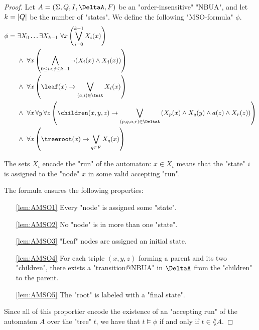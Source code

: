 \documentclass[a4paper,UKenglish,cleveref, autoref, thm-restate]{lipics-v2021}
\begin{document}
\begin{proof}
	Let $A = \NBUA$ be an "order-insensitive" "NBUA", and let $k = \left|Q\right|$ be the number of "states".
	We define the following "MSO-formula" $\phi$.
	\begin{align}
		\phi =\  & \exists X_0 \ldots \exists X_{k-1} \ \forall x \left( \bigvee_{i=0}^{k-1} X_i(x) \right) \label{lem:AMSO1}                                                                                     \\
		         & \land\ \forall x \left( \bigwedge_{0 \leq i < j \leq k-1} \lnot (X_i(x) \land X_j(x)) \right) \label{lem:AMSO2}                                                                                \\
		         & \land\ \forall x \left( \leaf(x) \rightarrow \bigvee_{(a,i) \in \Init} X_i(x) \right) \label{lem:AMSO3}                                                                                        \\
		         & \land\ \forall x\, \forall y\, \forall z \left(\children(x,y,z) \rightarrow \bigvee_{(p,q,a,r) \in \DeltaA} \left(X_p(x) \land X_q(y) \land a(z) \land X_r(z)\right) \right) \label{lem:AMSO4} \\
		         & \land\ \forall x \left( \treeroot(x) \rightarrow \bigvee_{q \in F} X_q(x) \right) \label{lem:AMSO5}
	\end{align}

	The sets $X_i$ encode the "run" of the automaton: $x \in X_i$ means that the "state" $i$ is assigned to the "node" $x$ in some valid accepting "run".

	The formula ensures the following properties:
	\begin{itemize}
		\item[\ref{lem:AMSO1}] Every "node" is assigned some "state".
		\item[\ref{lem:AMSO2}] No "node" is in more than one "state".
		\item[\ref{lem:AMSO3}] "Leaf" nodes are assigned an initial state.
		\item[\ref{lem:AMSO4}] For each triple $(x,y,z)$ forming a parent and its two "children",
		      there exists a "transition@NBUA" in $\DeltaA$ from the "children" to the parent.
		\item[\ref{lem:AMSO5}] The "root" is labeled with a "final state".
	\end{itemize}

	Since all of this proportier encode the existence of an "accepting run" of the automaton $A$ over the "tree" $t$, we have that
	$t \models \phi$ if and only if  $t \in \lang A$.
\end{proof}
\end{document}
